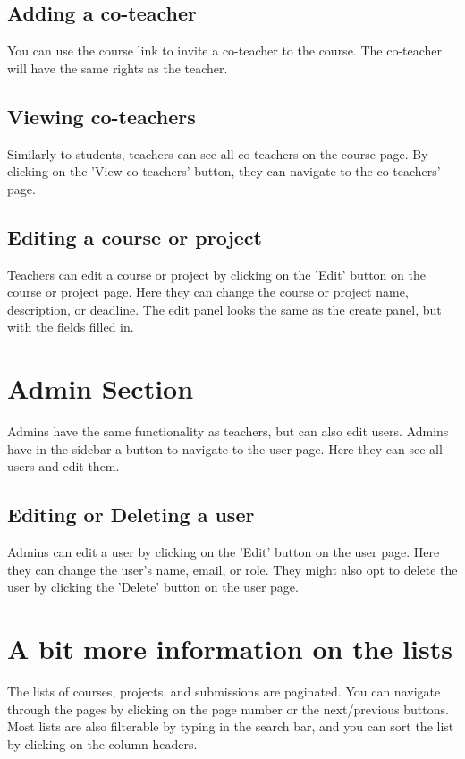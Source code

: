 \documentclass{article}
\begin{document}
\subsection{Adding a co-teacher}
You can use the course link to invite a co-teacher to the course. The co-teacher will have the same rights as the teacher.

\subsection{Viewing co-teachers}
Similarly to students, teachers can see all co-teachers on the course page. By clicking on the 'View co-teachers' button, they can navigate to the co-teachers' page.

\subsection{Editing a course or project}
Teachers can edit a course or project by clicking on the 'Edit' button on the course or project page. Here they can change the course or project name, description, or deadline. The edit panel looks the same as the create panel, but with the fields filled in.

\section{Admin Section}

Admins have the same functionality as teachers, but can also edit users. Admins have in the sidebar a button to navigate to the user page. Here they can see all users and edit them.

\subsection{Editing or Deleting a user}
Admins can edit a user by clicking on the 'Edit' button on the user page. Here they can change the user's name, email, or role. They might also opt to delete the user by clicking the 'Delete' button on the user page.

\section{A bit more information on the lists}
The lists of courses, projects, and submissions are paginated. You can navigate through the pages by clicking on the page number or the next/previous buttons.
Most lists are also filterable by typing in the search bar, and you can sort the list by clicking on the column headers.
\end{document}
